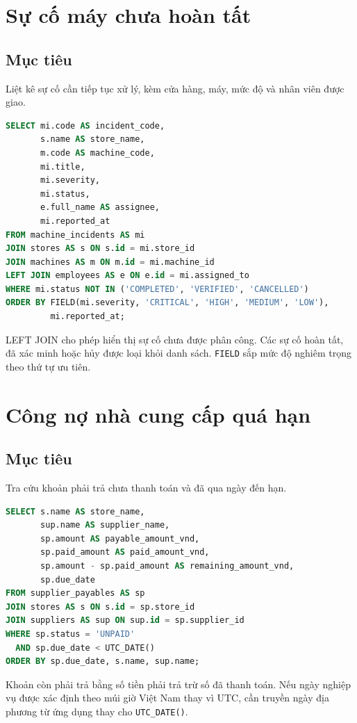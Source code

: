 \section{Sự cố máy chưa hoàn tất}
\subsection*{Mục tiêu}
Liệt kê sự cố cần tiếp tục xử lý, kèm cửa hàng, máy, mức độ và nhân viên được giao.
\begin{lstlisting}[language=SQL]
SELECT mi.code AS incident_code,
       s.name AS store_name,
       m.code AS machine_code,
       mi.title,
       mi.severity,
       mi.status,
       e.full_name AS assignee,
       mi.reported_at
FROM machine_incidents AS mi
JOIN stores AS s ON s.id = mi.store_id
JOIN machines AS m ON m.id = mi.machine_id
LEFT JOIN employees AS e ON e.id = mi.assigned_to
WHERE mi.status NOT IN ('COMPLETED', 'VERIFIED', 'CANCELLED')
ORDER BY FIELD(mi.severity, 'CRITICAL', 'HIGH', 'MEDIUM', 'LOW'),
         mi.reported_at;
\end{lstlisting}

LEFT JOIN cho phép hiển thị sự cố chưa được phân công. Các sự cố hoàn tất, đã xác minh hoặc hủy được loại khỏi danh sách. \texttt{FIELD} sắp mức độ nghiêm trọng theo thứ tự ưu tiên.

\section{Công nợ nhà cung cấp quá hạn}
\subsection*{Mục tiêu}
Tra cứu khoản phải trả chưa thanh toán và đã qua ngày đến hạn.
\begin{lstlisting}[language=SQL]
SELECT s.name AS store_name,
       sup.name AS supplier_name,
       sp.amount AS payable_amount_vnd,
       sp.paid_amount AS paid_amount_vnd,
       sp.amount - sp.paid_amount AS remaining_amount_vnd,
       sp.due_date
FROM supplier_payables AS sp
JOIN stores AS s ON s.id = sp.store_id
JOIN suppliers AS sup ON sup.id = sp.supplier_id
WHERE sp.status = 'UNPAID'
  AND sp.due_date < UTC_DATE()
ORDER BY sp.due_date, s.name, sup.name;
\end{lstlisting}

Khoản còn phải trả bằng số tiền phải trả trừ số đã thanh toán. Nếu ngày nghiệp vụ được xác định theo múi giờ Việt Nam thay vì UTC, cần truyền ngày địa phương từ ứng dụng thay cho \texttt{UTC\_DATE()}.

